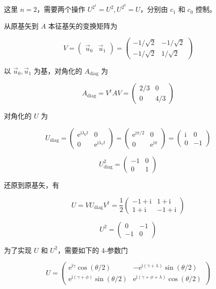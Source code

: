 \documentclass[aps,prl,twocolumn,groupedaddress]{revtex4-2}
\begin{document}
这里 $n=2$，需要两个操作 $U^{2^1}=U^2,U^{2^0}=U$，分别由 $c_1$ 和 $c_0$ 控制。

从原基矢到 $A$ 本征基矢的变换矩阵为

$$
V
=\begin{pmatrix}
\vec{u}_0 &\vec{u}_1 
\end{pmatrix}
=\begin{pmatrix}
-1/\sqrt{2} &-1/\sqrt{2} \\
-1/\sqrt{2} &1/\sqrt{2}
\end{pmatrix}
$$

以 $\vec{u}_0,\vec{u}_1$ 为基，对角化的 $A_{\mathrm{diag}}$ 为

$$
A_{\mathrm{diag}}
=V^\dag A V
=\begin{pmatrix}
2/3 &0 \\
0 &4/3
\end{pmatrix}
$$

对角化的 $U$ 为

$$
U_{\mathrm{diag}}
=\begin{pmatrix}
\mathrm{e}^{\mathrm{i}\lambda_0 t} &0 \\
0 &\mathrm{e}^{\mathrm{i}\lambda_1 t}
\end{pmatrix}
=\begin{pmatrix}
\mathrm{e}^{\mathrm{i}\pi/2} &0 \\
0 &\mathrm{e}^{\mathrm{i}\pi}
\end{pmatrix}
=\begin{pmatrix}
\mathrm{i} &0 \\
0 &-1
\end{pmatrix}
$$

$$
U_{\mathrm{diag}}^2
=\begin{pmatrix}
-1 &0 \\
0 &1
\end{pmatrix}
$$

还原到原基矢，有

$$
U
=V U_{\mathrm{diag}} V^\dag
=\frac{1 }{2 } \begin{pmatrix}
-1+\mathrm{i} &1+\mathrm{i} \\
1+\mathrm{i} &-1+\mathrm{i}
\end{pmatrix}
$$

$$
U^2
=\begin{pmatrix}
0 &-1 \\
-1 &0
\end{pmatrix}
$$

为了实现 $U$ 和 $U^2$，需要如下的 4-参数门

$$
U
=\begin{pmatrix}
\mathrm{e}^{\mathrm{i}\gamma }\cos(\theta/2) &-\mathrm{e}^{\mathrm{i}(\gamma+\lambda)}\sin(\theta/2) \\
\mathrm{e}^{\mathrm{i}(\gamma+\phi)}\sin(\theta/2) &\mathrm{e}^{\mathrm{i}(\gamma+\phi+\lambda)}\cos(\theta/2)
\end{pmatrix}
$$
\end{document}
